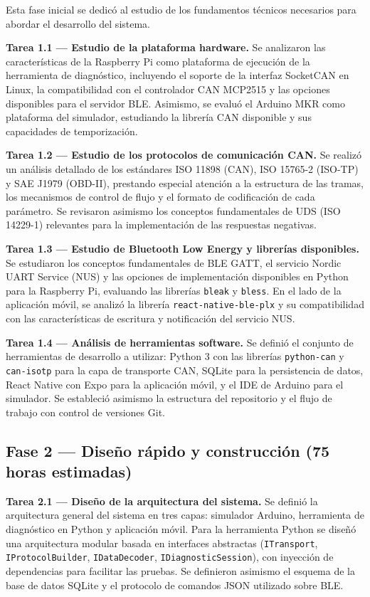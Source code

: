 Esta fase inicial se dedicó al estudio de los fundamentos técnicos necesarios para abordar el desarrollo del sistema.

\textbf{Tarea 1.1 — Estudio de la plataforma hardware.} Se analizaron las características de la Raspberry Pi como plataforma de ejecución de la herramienta de diagnóstico, incluyendo el soporte de la interfaz SocketCAN en Linux, la compatibilidad con el controlador CAN MCP2515 y las opciones disponibles para el servidor BLE. Asimismo, se evaluó el Arduino MKR como plataforma del simulador, estudiando la librería CAN disponible y sus capacidades de temporización.

\textbf{Tarea 1.2 — Estudio de los protocolos de comunicación CAN.} Se realizó un análisis detallado de los estándares ISO 11898 (CAN), ISO 15765-2 (ISO-TP) y SAE J1979 (OBD-II), prestando especial atención a la estructura de las tramas, los mecanismos de control de flujo y el formato de codificación de cada parámetro. Se revisaron asimismo los conceptos fundamentales de UDS (ISO 14229-1) relevantes para la implementación de las respuestas negativas.

\textbf{Tarea 1.3 — Estudio de Bluetooth Low Energy y librerías disponibles.} Se estudiaron los conceptos fundamentales de BLE GATT, el servicio Nordic UART Service (NUS) y las opciones de implementación disponibles en Python para la Raspberry Pi, evaluando las librerías \texttt{bleak} y \texttt{bless}. En el lado de la aplicación móvil, se analizó la librería \texttt{react-native-ble-plx} y su compatibilidad con las características de escritura y notificación del servicio NUS.

\textbf{Tarea 1.4 — Análisis de herramientas software.} Se definió el conjunto de herramientas de desarrollo a utilizar: Python 3 con las librerías \texttt{python-can} y \texttt{can-isotp} para la capa de transporte CAN, SQLite para la persistencia de datos, React Native con Expo para la aplicación móvil, y el IDE de Arduino para el simulador. Se estableció asimismo la estructura del repositorio y el flujo de trabajo con control de versiones Git.

\subsection{Fase 2 — Diseño rápido y construcción \textnormal{(75 horas estimadas)}}

\textbf{Tarea 2.1 — Diseño de la arquitectura del sistema.} Se definió la arquitectura general del sistema en tres capas: simulador Arduino, herramienta de diagnóstico en Python y aplicación móvil. Para la herramienta Python se diseñó una arquitectura modular basada en interfaces abstractas (\texttt{ITransport}, \texttt{IProtocolBuilder}, \texttt{IDataDecoder}, \texttt{IDiagnosticSession}), con inyección de dependencias para facilitar las pruebas. Se definieron asimismo el esquema de la base de datos SQLite y el protocolo de comandos JSON utilizado sobre BLE.

